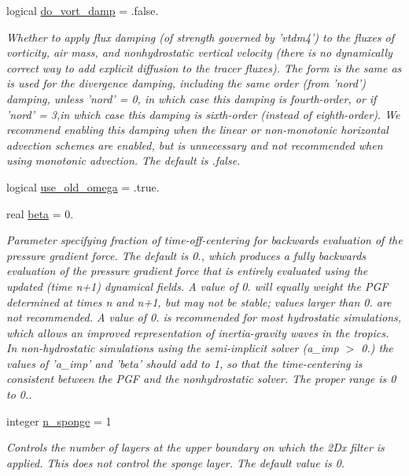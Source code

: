 \begin{DoxyCompactItemize}
logical \hyperlink{structfv__arrays__mod_1_1fv__flags__type_a06034f559635e41927ab1fc2de52c821}{do\-\_\-vort\-\_\-damp} = .false.
\begin{DoxyCompactList}\small\item\em Whether to apply flux damping (of strength governed by 'vtdm4') to the fluxes of vorticity, air mass, and nonhydrostatic vertical velocity (there is no dynamically correct way to add explicit diffusion to the tracer fluxes). The form is the same as is used for the divergence damping, including the same order (from 'nord') damping, unless 'nord' = 0, in which case this damping is fourth-\/order, or if 'nord' = 3,in which case this damping is sixth-\/order (instead of eighth-\/order). We recommend enabling this damping when the linear or non-\/monotonic horizontal advection schemes are enabled, but is unnecessary and not recommended when using monotonic advection. The default is .false. \end{DoxyCompactList}\item 
logical \hyperlink{structfv__arrays__mod_1_1fv__flags__type_a464a6eb5ffb4492e2ea207efc9c041ed}{use\-\_\-old\-\_\-omega} = .true.
\item 
real \hyperlink{structfv__arrays__mod_1_1fv__flags__type_a63b5db0b645857933a373aa3cf2a5926}{beta} = 0.
\begin{DoxyCompactList}\small\item\em Parameter specifying fraction of time-\/off-\/centering for backwards evaluation of the pressure gradient force. The default is 0., which produces a fully backwards evaluation of the pressure gradient force that is entirely evaluated using the updated (time n+1) dynamical fields. A value of 0. will equally weight the P\-G\-F determined at times n and n+1, but may not be stable; values larger than 0. are not recommended. A value of 0. is recommended for most hydrostatic simulations, which allows an improved representation of inertia-\/gravity waves in the tropics. In non-\/hydrostatic simulations using the semi-\/implicit solver (a\-\_\-imp $>$ 0.) the values of 'a\-\_\-imp' and 'beta' should add to 1, so that the time-\/centering is consistent between the P\-G\-F and the nonhydrostatic solver. The proper range is 0 to 0.. \end{DoxyCompactList}\item 
integer \hyperlink{structfv__arrays__mod_1_1fv__flags__type_a3aa416f1e3aa62eed9afe2a1eaabf673}{n\-\_\-sponge} = 1
\begin{DoxyCompactList}\small\item\em Controls the number of layers at the upper boundary on which the 2\-Dx filter is applied. This does not control the sponge layer. The default value is 0. \end{DoxyCompactList}\item 

\end{DoxyCompactItemize}
